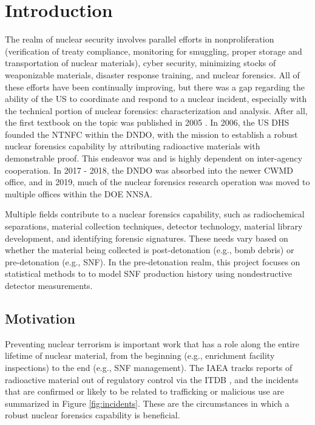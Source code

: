\chapter{Introduction}
\label{ch:intro}

The realm of nuclear security involves parallel efforts in nonproliferation
(verification of treaty compliance, monitoring for smuggling, proper storage
and transportation of nuclear materials), cyber security, minimizing stocks of
weaponizable materials, disaster response training, and nuclear forensics. All
of these efforts have been continually improving, but there was a gap regarding
the ability of the \gls{US} to coordinate and respond to a nuclear incident,
especially with the technical portion of nuclear forensics: characterization
and analysis. After all, the first textbook on the topic was published in 2005
\cite{nftext_2005}. In 2006, the \gls{US} \gls{DHS} founded the \gls{NTNFC}
within the \gls{DNDO}, with the mission to establish a robust nuclear forensics
capability by attributing radioactive materials with demonstrable proof. This
endeavor was and is highly dependent on inter-agency cooperation. In
2017 \-- 2018, the \gls{DNDO} was absorbed into the newer \gls{CWMD} office, and
in 2019, much of the nuclear forensics research operation was moved to multiple
offices within the \gls{DOE} \gls{NNSA}. 

Multiple fields contribute to a nuclear forensics capability, such as
radiochemical separations, material collection techniques, detector technology,
material library development, and identifying forensic signatures. These needs
vary based on whether the material being collected is post-detonation (e.g.,
bomb debris) or pre-detonation (e.g., \gls{SNF}).  In the
pre-detonation realm, this project focuses on statistical methods to to model
\gls{SNF} production history using nondestructive detector measurements. 

\section{Motivation}
\label{sec:motivation}

Preventing nuclear terrorism is important work that has a role along the entire
lifetime of nuclear material, from the beginning (e.g., enrichment facility
inspections) to the end (e.g., \gls{SNF} management). The \gls{IAEA} tracks
reports of radioactive material out of regulatory control via the \gls{ITDB}
\cite{itdb}, and the incidents that are confirmed or likely to be related to
trafficking or malicious use are summarized in Figure \ref{fig:incidents}.
These are the circumstances in which a robust nuclear forensics capability is
beneficial.

